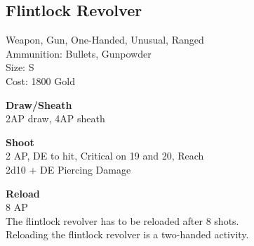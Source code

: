 \subsection{Flintlock Revolver}\label{weapon:flintlockRevolver}
Weapon, Gun, One-Handed, Unusual, Ranged\\
Ammunition: Bullets, Gunpowder\\
Size: S\\
Cost: 1800 Gold

\textbf{Draw/Sheath} \\
2AP draw, 4AP sheath

\textbf{Shoot} \\
2 AP, DE to hit, Critical on 19 and 20,  Reach\\
2d10 + DE Piercing Damage

\textbf{Reload} \\
8 AP\\
The flintlock revolver has to be reloaded after 8 shots.\\
Reloading the flintlock revolver is a two-handed activity.
